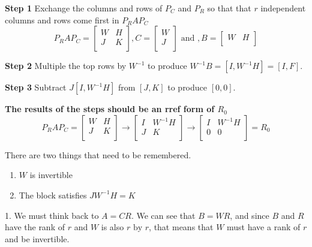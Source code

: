 \textbf{Step 1} Exchange the columns and rows of \(P_C\) and \(P_R\) so that that \(r\) independent columns and rows come first in \(P_{R}AP_C \)
\[
    P_{R}AP_C = 
    \begin{bmatrix}
        W & H  \\
        J & K  \\
    \end{bmatrix}
    , C = 
    \begin{bmatrix}
         W \\
         J \\
    \end{bmatrix}
    \text{ and }
    , B = 
    \begin{bmatrix}
        W & H  \\
    \end{bmatrix}
\]    

\textbf{Step 2} Multiple the top rows by \(W^{-1}\) to produce \(W^{-1}B = [I, W^{-1}H] = [I, F]\).

\textbf{Step 3} Subtract \(J[I, W^{-1}H]\) from \([J, K]\) to produce \([0, 0]\). 

\textbf{The results of the steps should be an rref form of \(R_0\)}
\[
    P_{R}AP_{C} = 
    \begin{bmatrix}
        W & H  \\
        J & K  \\
    \end{bmatrix}
    \rightarrow
    \begin{bmatrix}
        I & W^{-1}H  \\
        J & K  \\
    \end{bmatrix}
    \rightarrow
    \begin{bmatrix}
        I & W^{-1}H   \\
        0 & 0  \\
    \end{bmatrix}
    = R_0
\] 

There are two things that need to be remembered. 
\begin{enumerate}
    \item \(W\)  is invertible
    \item The block satisfies \(JW^{-1}H = K\) 
\end{enumerate}

1. We must think back to \(A = CR\). We can see that \(B = WR\), and since \(B\) and \(R\) have the rank of \(r\) and \(W\) is also \(r \text{ by } r\), that means that \(W\) must have a rank of \(r\) and be invertible. 

